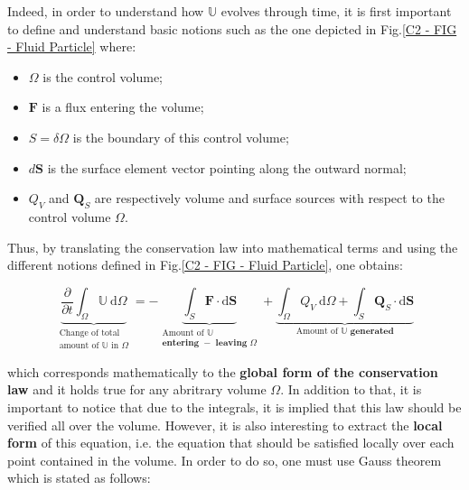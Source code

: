Indeed, in order to understand how $\mathbb{U}$ evolves through time, it is first important to define and understand basic notions such as the one depicted in Fig.\ref{C2 - FIG - Fluid Particle} where:

\begin{itemize}
	\item$\Omega$ is the control volume;
	\item$\mathbf{F}$ is a flux entering the volume;
	\item$S = \delta \Omega$ is the boundary of this control volume;
	\item$d\mathbf{S}$ is the surface element vector pointing along the outward normal;
	\item$Q_V$ and $\mathbf{Q}_S$ are respectively volume and surface sources with respect to the control volume $\Omega$.
\end{itemize}

\newpage

Thus, by translating  the conservation law into mathematical terms and using the different notions defined in Fig.\ref{C2 - FIG - Fluid Particle}, one obtains:

\vspace{0.1em}
\begin{equation*}
\underbrace{\frac{\partial}{\partial t} \int_{\Omega} \mathbb{U} \mathrm{~d} \Omega}_{\substack{\text{Change of total} \\ \text{amount of } \mathbb{U} \text{ in } \Omega}} =
- \underbrace{\int_S \mathbf{F} \cdot \mathrm{d} \mathbf{S}}_{\substack{\text{Amount of } \mathbb{U} \\ \textbf{entering }  - \textbf{ leaving } \Omega}}
+\underbrace{\int_{\Omega} Q_V \mathrm{~d} \Omega
+\int_S \mathbf{Q}_S \cdot \mathrm{d} \mathbf{S}}_{\text{Amount of } \mathbb{U} \textbf{ generated}}
\end{equation*}
\vspace{0.2em}

which corresponds mathematically to the \textbf{global form of the conservation law} and it holds true for any abritrary volume $\Omega$. In addition to that, it is important to notice that due to the integrals, it is implied that this law should be verified all over the volume. However, it is also interesting to extract the \textbf{local form} of this equation, i.e. the equation that should be satisfied locally over each point contained in the volume. In order to do so, one must use Gauss theorem which is stated as follows:

